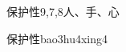 \begin{entry}{保护性}{9,7,8}{⼈、⼿、⼼}
  \begin{phonetics}{保护性}{bao3hu4xing4}
  \end{phonetics}
\end{entry}
